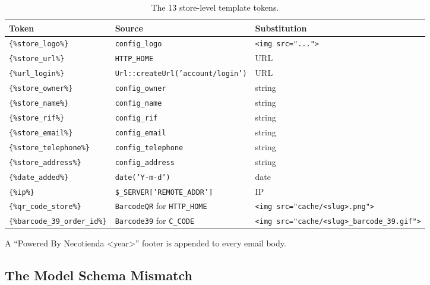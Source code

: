 \documentclass[11pt,a4paper]{article}
\begin{document}
\begin{table}[htbp]
\centering
\caption{The 13 store-level template tokens.}\label{tab:template-tokens}
\footnotesize\sloppy
\begin{tabularx}{\columnwidth}{llX}
\toprule
\textbf{Token} & \textbf{Source} & \textbf{Substitution} \\
\midrule
\texttt{\{\%store\_logo\%\}}       & \texttt{config\_logo} & \texttt{<img src="...">} \\
\texttt{\{\%store\_url\%\}}        & \texttt{HTTP\_HOME} & URL \\
\texttt{\{\%url\_login\%\}}        & \texttt{Url::createUrl('account/login')} & URL \\
\texttt{\{\%store\_owner\%\}}      & \texttt{config\_owner} & string \\
\texttt{\{\%store\_name\%\}}       & \texttt{config\_name} & string \\
\texttt{\{\%store\_rif\%\}}        & \texttt{config\_rif} & string \\
\texttt{\{\%store\_email\%\}}      & \texttt{config\_email} & string \\
\texttt{\{\%store\_telephone\%\}}  & \texttt{config\_telephone} & string \\
\texttt{\{\%store\_address\%\}}    & \texttt{config\_address} & string \\
\texttt{\{\%date\_added\%\}}       & \texttt{date('Y-m-d')} & date \\
\texttt{\{\%ip\%\}}                & \texttt{\$\_SERVER['REMOTE\_ADDR']} & IP \\
\texttt{\{\%qr\_code\_store\%\}}   & \texttt{BarcodeQR} for \texttt{HTTP\_HOME} & \texttt{<img src="cache/<slug>.png">} \\
\texttt{\{\%barcode\_39\_order\_id\%\}} & \texttt{Barcode39} for \texttt{C\_CODE} & \texttt{<img src="cache/<slug>\_barcode\_39.gif">} \\
\bottomrule
\end{tabularx}
\end{table}

A ``Powered By Necotienda <year>'' footer is appended to every
email body.

\subsection{The Model Schema Mismatch}
\end{document}
